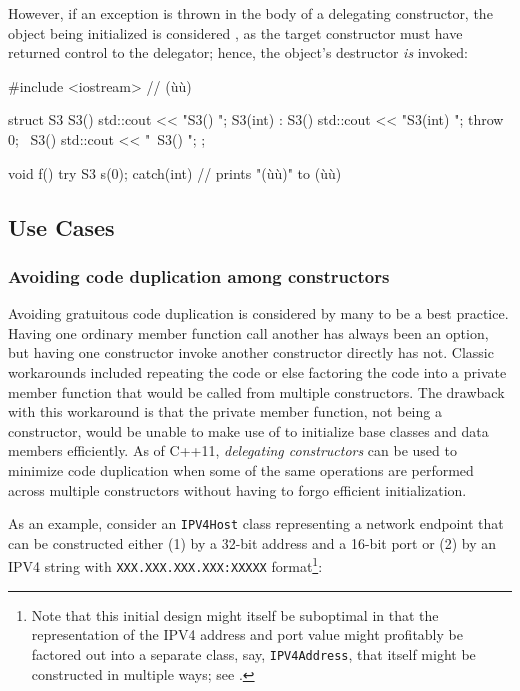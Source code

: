 However, if an exception is thrown in the body of a delegating
constructor, the object being initialized is considered , as the target constructor must have returned control to
the delegator; hence, the object's destructor \emph{is} invoked:

\begin{emcppslisting}
#include <iostream>  // (ù{}ù)

struct S3
{
    S3()           { std::cout << "S3() ";             }
    S3(int) : S3() { std::cout << "S3(int) "; throw 0; }
    ~S3()          { std::cout << "~S3() ";            }
};

void f() try { S3 s(0); } catch(int) { }
    // prints "(ù{}ù)" to (ù{}ù)
\end{emcppslisting}


\subsection[Use Cases]{Use Cases}\label{ctordelegating-use-cases}

\subsubsection[Avoiding code duplication among constructors]{Avoiding code duplication among constructors}\label{avoiding-code-duplication-among-constructors}

Avoiding gratuitous code duplication is considered by many to be a best
practice. Having one ordinary member function call another has always
been an option, but having one constructor invoke another constructor
directly has not. Classic workarounds included repeating the code or
else factoring the code into a private member function that would be
called from multiple constructors. The drawback with this workaround is
that the private member function, not being a constructor, would be unable to
make use of  to initialize base classes and data members efficiently. As of C++11, \emph{delegating
constructors} can be used to minimize code duplication when some of
the same operations are performed across multiple constructors without
having to forgo efficient initialization.

As an example, consider an \lstinline!IPV4Host! class representing a
network endpoint that can be constructed either (1) by a 32-bit address
and a 16-bit port or (2) by an IPV4 string with
\lstinline!XXX.XXX.XXX.XXX:XXXXX! format{\cprotect\footnote{Note that
this initial design might itself be suboptimal in that the
representation of the IPV4 address and port value might profitably be
factored out into a separate  class, say,
\lstinline!IPV4Address!, that itself might be constructed in multiple ways;
  see .}}:


